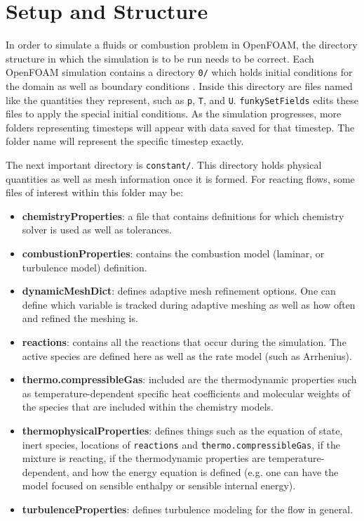 
\section{Setup and Structure}
In order to simulate a fluids or combustion problem in OpenFOAM, the directory structure in which the simulation is to be run needs to be correct. Each OpenFOAM simulation contains a directory \verb|0/| which holds initial conditions for the domain as well as boundary conditions \cite{ofug}. Inside this directory are files named like the quantities they represent, such as \verb|p|, \verb|T|, and \verb|U|. \verb|funkySetFields| edits these files to apply the special initial conditions. As the simulation progresses, more folders representing timesteps will appear with data saved for that timestep. The folder name will represent the specific timestep exactly. 

The next important directory is \verb|constant/|. This directory holds physical quantities as well as mesh information once it is formed. For reacting flows, some files of interest within this folder may be:

\begin{itemize}
    \item \textbf{chemistryProperties}: a file that contains definitions for which chemistry solver is used as well as tolerances.
    \item \textbf{combustionProperties}: contains the combustion model (laminar, or turbulence model) definition.
    \item \textbf{dynamicMeshDict}: defines adaptive mesh refinement options. One can define which variable is tracked during adaptive meshing as well as how often and refined the meshing is. 
    \item \textbf{reactions}: contains all the reactions that occur during the simulation. The active species are defined here as well as the rate model (such as Arrhenius). 
    \item \textbf{thermo.compressibleGas}: included are the thermodynamic properties such as temperature-dependent specific heat coefficients and molecular weights of the species that are included within the chemistry models.
    \item \textbf{thermophysicalProperties}: defines things such as the equation of state, inert species, locations of \verb|reactions| and \verb|thermo.compressibleGas|, if the mixture is reacting, if the thermodynamic properties are temperature-dependent, and how the energy equation is defined (e.g. one can have the model focused on sensible enthalpy or sensible internal energy).
    \item \textbf{turbulenceProperties}: defines turbulence modeling for the flow in general. 
\end{itemize}


